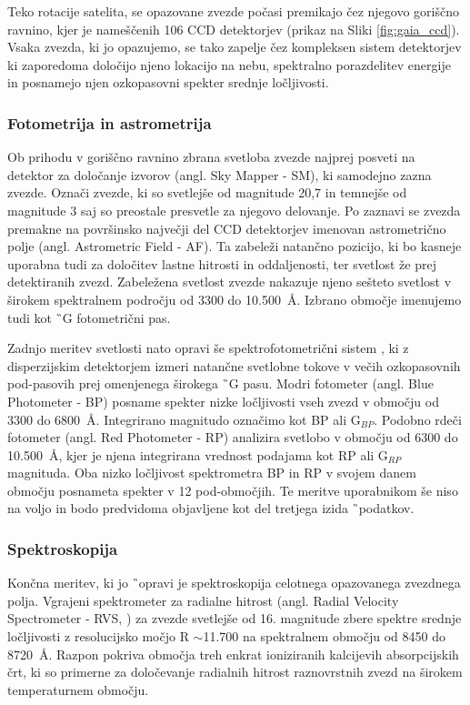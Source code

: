 Teko rotacije satelita, se opazovane zvezde počasi premikajo čez njegovo goriščno ravnino, kjer je nameščenih 106 CCD detektorjev (prikaz na Sliki \ref{fig:gaia_ccd}). Vsaka zvezda, ki jo opazujemo, se tako zapelje čez kompleksen sistem detektorjev ki zaporedoma določijo njeno lokacijo na nebu, spektralno porazdelitev energije in posnamejo njen ozkopasovni spekter srednje ločljivosti.

\subsubsection{Fotometrija in astrometrija}
Ob prihodu v goriščno ravnino zbrana svetloba zvezde najprej posveti na detektor za določanje izvorov (angl. Sky Mapper - SM), ki samodejno zazna zvezde. Označi zvezde, ki so svetlejše od magnitude 20,7 in temnejše od magnitude 3 saj so preostale presvetle za njegovo delovanje. Po zaznavi se zvezda premakne na površinsko največji del CCD detektorjev imenovan astrometrično polje (angl. Astrometric Field - AF). Ta zabeleži natančno pozicijo, ki bo kasneje uporabna tudi za določitev lastne hitrosti in oddaljenosti, ter svetlost že prej detektiranih zvezd. Zabeležena svetlost zvezde nakazuje njeno sešteto svetlost v širokem spektralnem področju od 3300 do 10.500~\AA. Izbrano območje imenujemo tudi kot \G\ G fotometrični pas.

Zadnjo meritev svetlosti nato opravi še spektrofotometrični sistem \cite{2018arXiv180409368E}, ki z disperzijskim detektorjem izmeri natančne svetlobne tokove v večih ozkopasovnih pod-pasovih prej omenjenega širokega \G\ G pasu. Modri fotometer (angl. Blue Photometer - BP) posname spekter nizke ločljivosti vseh zvezd v območju od 3300 do 6800~\AA. Integrirano magnitudo označimo kot BP ali G$_{BP}$. Podobno rdeči fotometer (angl. Red Photometer - RP) analizira svetlobo v območju od 6300 do 10.500~\AA, kjer je njena integrirana vrednost podajama kot RP ali G$_{RP}$ magnituda. Oba nizko ločljivost spektrometra BP in RP v svojem danem območju posnameta spekter v 12 pod-območjih. Te meritve uporabnikom še niso na voljo in bodo predvidoma objavljene kot del tretjega izida \G\ podatkov.

\subsubsection{Spektroskopija}
Končna meritev, ki jo \G\ opravi je spektroskopija celotnega opazovanega zvezdnega polja. Vgrajeni spektrometer za radialne hitrost (angl. Radial Velocity Spectrometer - RVS, \cite{2018A&A...616A...5C}) za zvezde svetlejše od 16. magnitude zbere spektre srednje ločljivosti z resolucijsko močjo R $\sim$11.700 na spektralnem območju od 8450 do 8720~\AA. Razpon pokriva območja treh enkrat ioniziranih kalcijevih absorpcijskih črt, ki so primerne za določevanje radialnih hitrost raznovrstnih zvezd na širokem temperaturnem območju.

